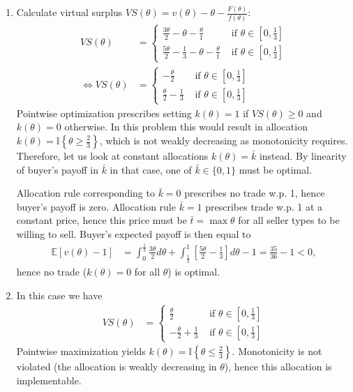 \documentclass[a4paper]{article}
\begin{document}
\begin{enumerate}
	
	\item 
	Calculate virtual surplus $VS(\theta) = v(\theta) - \theta - \frac{F(\theta)}{f(\theta)}$: 
	\begin{align*}
		VS(\theta) &= 
		\begin{cases}
			\frac{3\theta}{2} - \theta - \frac{\theta}{1} &\text{ if } \theta \in [0, \frac{1}{3}]
			\\
			\frac{5\theta}{2} - \frac{1}{3} - \theta - \frac{\theta}{1} &\text{ if } \theta \in [0, \frac{1}{3}]
		\end{cases}
		\\
		\Leftrightarrow
		VS(\theta) &= 
		\begin{cases}
			-\frac{\theta}{2} &\text{ if } \theta \in [0, \frac{1}{3}]
			\\
			\frac{\theta}{2} - \frac{1}{3} &\text{ if } \theta \in [0, \frac{1}{3}]
		\end{cases}
	\end{align*}
	Pointwise optimization prescribes setting $k(\theta) = 1$ if $VS(\theta) \geq 0$ and $k(\theta) = 0$ otherwise. In this problem this would result in allocation $k(\theta) = \mathbb{I} \left\{ \theta \geq \frac{2}{3} \right\}$, which is not weakly decreasing as monotonicity requires.
	Therefore, let us look at constant allocations $k(\theta) = \bar{k}$ instead. By linearity of buyer's payoff in $\bar{k}$ in that case, one of $\bar{k} \in \{0,1\}$ must be optimal.
	
	Allocation rule corresponding to $\bar{k} = 0$ prescribes no trade w.p. 1, hence buyer's payoff is zero. Allocation rule $\bar{k} = 1$ prescribes trade w.p. 1 at a constant price, hence this price must be $\bar{t} = \max \theta$ for all seller types to be willing to sell. Buyer's expected payoff is then equal to
	\begin{align*}
		\mathbb{E} \left[ v(\theta) - 1 \right] &= \int_0^{\frac{1}{3}} \frac{3\theta}{2} d\theta + \int_{\frac{1}{3}}^{1} \left[ \frac{5 \theta}{2} - \frac{1}{3} \right] d\theta -1 = \frac{35}{36} - 1 < 0,
	\end{align*}
	hence no trade ($k(\theta) = 0$ for all $\theta$) is optimal.
	
	
	\item 	
	In this case we have
	\begin{align*}
		VS(\theta) &= 
		\begin{cases}
			\frac{\theta}{2} &\text{ if } \theta \in [0, \frac{1}{3}]
			\\
			-\frac{\theta}{2} + \frac{1}{3} &\text{ if } \theta \in [0, \frac{1}{3}]
		\end{cases}
	\end{align*}
	Pointwise maximization yields $k(\theta) = \mathbb{I} \left\{ \theta \leq \frac{2}{3} \right\}$. Monotonicity is not violated (the allocation is weakly decreasing in $\theta$), hence this allocation is implementable.
\end{enumerate}
\fi
\end{document}
